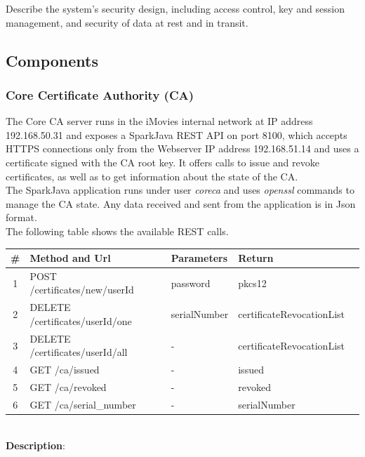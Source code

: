 \documentclass[english]{article}
\begin{document}
Describe the system's security design, including access control, key and session management,  and security of data at rest and in transit.


\subsection{Components}

\subsubsection{Core Certificate Authority (CA)}
The Core CA server runs in the iMovies internal network at IP address 192.168.50.31 and exposes a SparkJava REST API on port 8100, which accepts HTTPS connections only from the Webserver IP address 192.168.51.14 and uses a certificate signed with the CA root key. It offers calls to issue and revoke certificates, as well as to get information about the state of the CA.\\
The SparkJava application runs under user \emph{coreca} and uses \emph{openssl} commands to manage the CA state. Any data received and sent from the application is in Json format.\\
The following table shows the available REST calls.
\\
\begin{tabular} {| c | l | l | l | l |}
\hline
\textbf{\#} & \textbf{Method and Url} & \textbf{Parameters} & \textbf{Return}\\
\hline
1 & POST /certificates/new/userId & password & pkcs12\\
\hline
2 & DELETE /certificates/userId/one & serialNumber & certificateRevocationList\\
\hline
3 & DELETE /certificates/userId/all & - & certificateRevocationList\\
\hline
4 & GET /ca/issued & - & issued\\
\hline
5 & GET /ca/revoked & - & revoked\\
\hline
6 & GET /ca/serial\_number & - & serialNumber\\
\hline
\end{tabular}
\\
\textbf{Description}:
\end{document}
